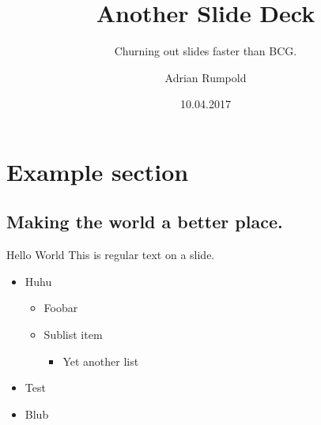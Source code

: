 \documentclass{beamer}
\author{Adrian Rumpold}
\title{Another Slide Deck}
\subtitle{Churning out slides faster than BCG.}
\institute{Institute for Applied Beer Brewing, University of Augsburg}
\date{10.04.2017}
\begin{document}
\begin{frame}[plain]
  \titlepage
\end{frame}

\section{Example section}
\subsection{Making the world a better place.}
\begin{frame}{Hello World}
  This is regular text on a slide.
  
  \begin{itemize}
  \item Huhu
    \begin{itemize}
    \item Foobar
    \item Sublist item
      \begin{itemize}
      \item Yet another list
      \end{itemize}
    \end{itemize}
  \item Test
  \item Blub
  \end{itemize}
\end{frame}
\end{document}
